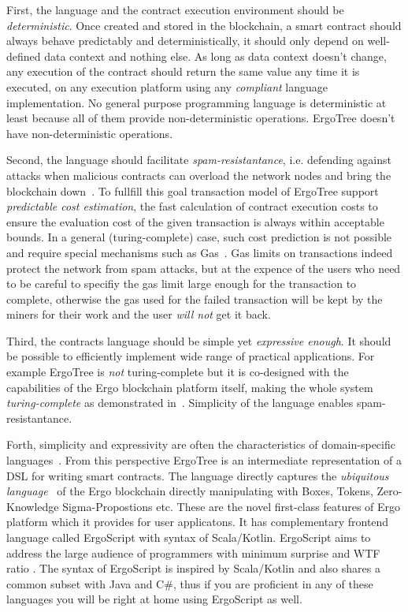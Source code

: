 \documentclass[11pt]{article}
\newcommand{\ASDag}{ErgoTree\xspace}
\begin{document}
First, the language and the contract execution environment should be
\emph{deterministic}. Once created and stored in the blockchain, a smart contract
should always behave predictably and deterministically, it should only depend on
well-defined data context and nothing else. As long as data context doesn't change, any
execution of the contract should return the same value any time it is executed, on any
execution platform using any \emph{compliant} language implementation. No general
purpose programming language is deterministic at least because all of them provide
non-deterministic operations. \ASDag doesn't have non-deterministic operations.

Second, the language should facilitate \emph{spam-resistantance}, i.e. defending
against attacks when malicious contracts can overload the network nodes and bring the
blockchain down~\cite{fivehrs}. To fullfill this goal transaction model of \ASDag support
\emph{predictable cost estimation}, the fast calculation of contract execution costs to
ensure the evaluation cost of the given transaction is always within acceptable bounds.
In a general (turing-complete) case, such cost prediction is not possible and require
special mechanisms such as Gas~\cite{wood2014ethereum}. Gas limits on transactions
indeed protect the network from spam attacks, but at the expence of the users who need to
be careful to specifiy the gas limit large enough for the transaction to complete,
otherwise the gas used for the failed transaction will be kept by the miners for their
work and the user \emph{will not} get it back.

Third, the contracts language should be simple yet \emph{expressive enough}. It
should be possible to efficiently implement wide range of practical applications. For example
\ASDag is \emph{not} turing-complete but it is co-designed with the capabilities of the
Ergo blockchain platform itself, making the whole system \emph{turing-complete} as 
demonstrated in~\cite{CKM18}. Simplicity of the language enables spam-resistantance.

Forth, simplicity and expressivity are often the characteristics of domain-specific
languages~\cite{dslbook,HudakDSL}. From this perspective \ASDag is an intermediate
representation of a DSL for writing smart contracts. The language directly captures the
\emph{ubiquitous language}~\cite{UbiqLang} of the Ergo blockchain directly manipulating
with Boxes, Tokens, Zero-Knowledge Sigma-Propostions etc. These are the novel
first-class features of Ergo platform which it provides for user applicatons. It has
complementary frontend language called ErgoScript with syntax of Scala/Kotlin.
ErgoScript aims to address the large audience of programmers with minimum surprise and
WTF ratio \cite{WTFLang}. The syntax of ErgoScript is inspired by Scala/Kotlin and also
shares a common subset with Java and C\#, thus if you are proficient in any of these
languages you will be right at home using ErgoScript as well.
\end{document}
